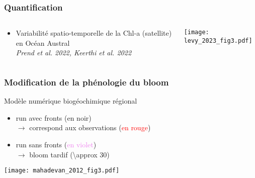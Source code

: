 \documentclass[11pt, french, aspectratio=32]{beamer}
\begin{document}
\begin{frame}
  \frametitle{Quantification}
  \begin{columns}
    \begin{column}{0.66\linewidth}
      \begin{itemize}
        \item Variabilité spatio-temporelle de la Chl-a (satellite) en Océan Austral
              \\
              {\footnotesize\textit{Prend et al. 2022, Keerthi et al. 2022}}
      \end{itemize}
    \end{column}
    \begin{column}{0.33\linewidth}
      \texttt{[image: levy\_2023\_fig3.pdf]}
    \end{column}
  \end{columns}

  \vspace*{2em}

\end{frame}


\endgroup


\begin{frame}
  \frametitle{Modification de la phénologie du bloom}

  \begin{block}{}
    Modèle numérique biogéochimique régional
    \begin{itemize}
      \item run avec fronts (en noir)
            \\\(\rightarrow\) correspond aux observations (\textcolor{red}{en rouge})
      \item<2-> run sans fronts (\textcolor{violet}{en violet})
            \\\(\rightarrow\) bloom tardif (\qty{\approx 30}{})
    \end{itemize}
  \end{block}

  \texttt{[image: mahadevan\_2012\_fig3.pdf]}
  {\hspace{1em}\footnotesize\textit{\raisebox{2em}{Mahadevan et al.\ 2012}}}
\end{frame}
\end{document}
